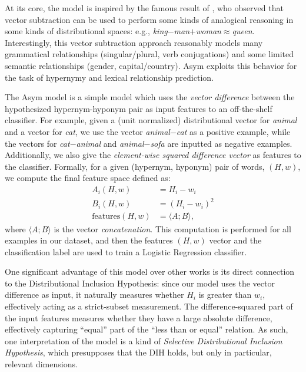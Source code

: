 At its core, the model is inspired by the famous result of
, who observed that vector subtraction can be used
to perform some kinds of analogical reasoning in some kinds of distributional
spaces: e.g., {\em king}$ - ${\em man}$ + ${\em woman}$ \approx ${\em queen}.
Interestingly, this vector subtraction approach reasonably models many
grammatical relationships (singular/plural, verb conjugations) and some limited
semantic relationships (gender, capital/country). Asym exploits this
behavior for the task of hypernymy and lexical relationship prediction.

The Asym model is a simple model which uses the {\em vector difference} between
the hypothesized hypernym-hyponym pair as input features to an off-the-shelf
classifier. For example, given a (unit normalized) distributional vector for
{\em animal} and a vector for {\em cat}, we use the vector
{\em animal}$ - ${\em cat} as a positive example, while the
vectors for {\em cat}$ - ${\em animal} and {\em animal}$ - ${\em sofa} are
inputted as negative examples. Additionally, we also give the {\em element-wise
squared difference vector} as features to the classifier. Formally, for a given
(hypernym, hyponym) pair of words, $(H, w)$, we compute the final feature space
defined as:
\begin{align*}
  A_i(H, w) & = H_i - w_i\\
  B_i(H, w) & = (H_i - w_i)^2\\
  \text{features}(H, w) & = \langle A; B\rangle,
\end{align*}
where $\langle A; B\rangle$ is the vector {\em concatenation}. This computation
is performed for all examples in our dataset, and then the features $(H, w)$
vector and the classification label are used to train a Logistic Regression
classifier.

One significant advantage of this model over other works is its direct
connection to the Distributional Inclusion Hypothesis: since our model uses the
vector difference as input, it naturally measures whether $H_i$ is
greater than $w_i$, effectively acting as a strict-subset measurement. The
difference-squared part of the input features measures whether they have a
large absolute difference, effectively capturing ``equal'' part of the
``less than or equal'' relation. As such, one interpretation of the model is a
kind of {\em Selective Distributional Inclusion Hypothesis}, which presupposes
that the DIH holds, but only in particular, relevant dimensions.

